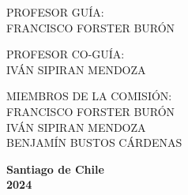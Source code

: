 \documentclass[../tesis.tex]{subfiles}
\begin{document}
\begin{titlepage}
\begin{center}
        \vfill

        \uppercase{Profesor Guía:}\\
        \uppercase{Francisco Forster Burón}

        \vspace{1cm}

        \uppercase{Profesor co-guía:}\\
        \uppercase{Iván Sipiran Mendoza}

        \vspace{1cm}

        \uppercase{MIEMBROS DE LA COMISIÓN:}\\
        \uppercase{Francisco Forster Burón}\\
        \uppercase{Iván Sipiran Mendoza}\\
        \uppercase{Benjamín Bustos Cárdenas}

        \vspace{1cm}

        \vfill

        \textbf{Santiago de Chile\\2024}

    \end{center}
\end{titlepage}
\end{document}
